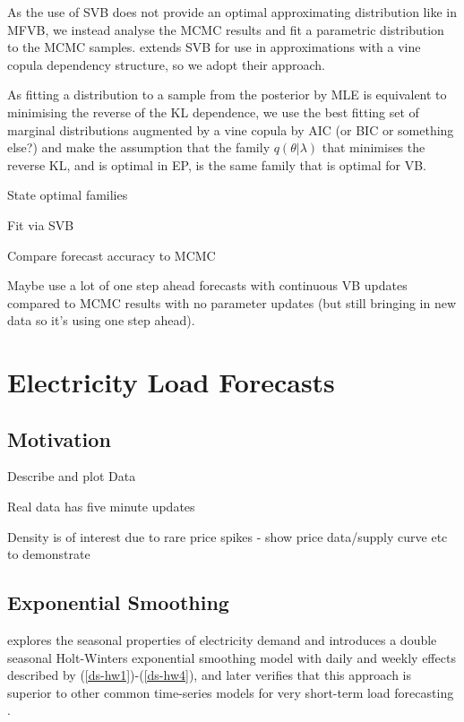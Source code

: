 \documentclass{article}\usepackage[]{graphicx}\usepackage[]{color}
\numberwithin{equation}{section}
\begin{document}
As the use of SVB does not provide an optimal approximating distribution like in MFVB, we instead analyse the MCMC results and fit a parametric distribution to the MCMC samples. \citet{Tran2015} extends SVB for use in approximations with a vine copula dependency structure, so we adopt their approach.

As fitting a distribution to a sample from the posterior by MLE is equivalent to minimising the reverse of the KL dependence, we use the best fitting set of marginal distributions augmented by a vine copula by AIC (or BIC or something else?) and make the assumption that the family $q(\theta | \lambda)$ that minimises the reverse KL, and is optimal in EP, is the same family that is optimal for VB.

\begin{list}
\item State optimal families
\item Fit via SVB
\item Compare forecast accuracy to MCMC 
\item Maybe use a lot of one step ahead forecasts with continuous VB updates compared to MCMC results with no parameter updates (but still bringing in new data so it's using one step ahead).
\end{list}

\section{Electricity Load Forecasts}
\subsection{Motivation}
\begin{list}
\item Describe and plot Data
\item Real data has five minute updates
\item Density is of interest due to rare price spikes - show price data/supply curve etc to demonstrate
\end{list}

\subsection{Exponential Smoothing}

\citet{Taylor2003} explores the seasonal properties of electricity demand and introduces a double seasonal Holt-Winters exponential smoothing model with daily and weekly effects described by (\ref{ds-hw1})-(\ref{ds-hw4}), and later verifies that this approach is superior to other common time-series models for very short-term load forecasting \citep{Taylor2008}.
\end{document}
